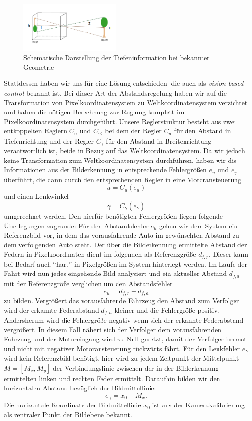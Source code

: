 \documentclass[10pt]{article}
\begin{document}
    \begin{figure}[hbtp]
        \centering
        \includegraphics[width=0.45\textwidth]{Pinholeobject_label}
        \caption{Schematische Darstellung der Tiefeninformation bei bekannter Geometrie}\label{fig:reifenradius}
    \end{figure}
    Stattdessen haben wir uns für eine Lösung entschieden, die auch als \textit{vision based control} bekannt ist.
    Bei dieser Art der Abstandsregelung haben wir auf die Transformation von Pixelkoordinatensystem zu Weltkoordinatensystem verzichtet und haben die nötigen Berechnung zur Reglung komplett im Pixelkoordinatensystem durchgeführt.
    Unsere Reglerstruktur besteht aus zwei entkoppelten Reglern $C_u$ und $C_{\gamma}$, bei dem der Regler $C_u$ für den Abstand in Tiefenrichtung und der Regler $C_{\gamma}$ für den Abstand in Breitenrichtung verantwortlich ist, beide in Bezug auf das Weltkoordinatensystem.
    Da wir jedoch keine Transformation zum Weltkoordinatensystem durchführen, haben wir die Informationen aus der Bilderkennung in entsprechende Fehlergrößen $e_u$ und $e_{\gamma}$ überführt, die dann durch den entsprechenden Regler in eine Motoransteuerung \[u = C_u(e_u)\] und einen Lenkwinkel \[\gamma = C_{\gamma}(e_{\gamma})\] umgerechnet werden.
    Den hierfür benötigten Fehlergrößen liegen folgende Überlegungen zugrunde:
    Für den Abstandsfehler $e_u$ geben wir dem System ein Referenzbild vor, in dem das vorausfahrende Auto im gewünschten Abstand zu dem verfolgenden Auto steht.
    Der über die Bilderkennung ermittelte Abstand der Federn in Pixelkoordinaten dient im folgenden als Referenzgröße $d_{f,r}$.
    Dieser kann bei Bedarf auch \enquote{hart} in Pixelgrößen im System hinterlegt werden.
    Im Laufe der Fahrt wird nun jedes eingehende Bild analysiert und ein aktueller Abstand $d_{f,a}$ mit der Referenzgröße verglichen um den Abstandsfehler \[
    e_u = d_{f,r} -d_{f,a}
    \] zu bilden.
    Vergrößert das vorausfahrende Fahrzeug den Abstand zum Verfolger wird der erkannte Federabstand $ d_{f,a}$ kleiner und die Fehlergröße positiv. Andersherum wird die Fehlergröße negativ wenn sich der erkannte Federabstand vergrößert.
    In diesem Fall nähert sich der Verfolger dem vorausfahrenden Fahrzeug und der Motoreingang wird zu Null gesetzt, damit der Verfolger bremst und nicht mit negativer Motoransteuerung rückwärts fährt.
    Für den Lenkfehler $e_{\gamma}$ wird kein Referenzbild benötigt, hier wird zu jedem Zeitpunkt der Mittelpunkt $M=\left[M_x, M_y\right]$ der Verbindungslinie zwischen der in der Bilderkennung ermittelten linken und rechten Feder ermittelt. Daraufhin bilden wir den horizontalen Abstand bezüglich der Bildmittellinie: \[
    e_{\gamma} = x_0 - M_x.
    \]
    Die horizontale Koordinate der Bildmittellinie $x_0$ ist aus der Kamerakalibrierung als zentraler Punkt der Bildebene bekannt.
\end{document}
